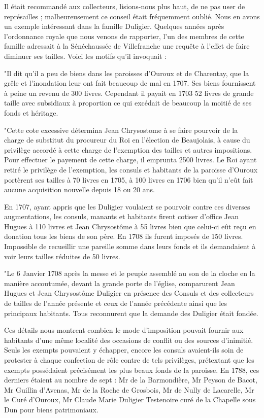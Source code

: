 Il était recommandé aux collecteurs, lisions-nous plus haut, de ne pas user de représailles ; malheureusement ce conseil était fréquemment oublié. Nous en avons un exemple intéressant dans la famille Duligier. Quelques années après l'ordonnance royale que nous venons de rapporter, l'un des membres de cette famille adressait à la Sénéchaussée de Villefranche une requête à l'effet de faire diminuer ses tailles. Voici les motifs qu'il invoquait :

"Il dit qu'il a peu de biens dans les paroisses d'Ouroux et de Charentay, que la grêle et l'inondation leur ont fait beaucoup de mal en 1707. Ses biens fournissent à peine un revenu de 300 livres. Cependant il payait en 1703 52 livres de grande taille avec subsidiaux à proportion ce qui excédait de beaucoup la moitié de ses fonds et héritage.

"Cette cote excessive détermina Jean Chrysostome à se faire pourvoir de la charge de substitut du procureur du Roi en l'élection de Beaujolais, à cause du privilège accordé à cette charge de l'exemption des tailles et autres impositions. Pour effectuer le payement de cette charge, il emprunta 2500 livres. Le Roi ayant retiré le privilège de l'exemption, les consuls et habitants de la paroisse d'Ouroux portèrent ses tailles à 70 livres en 1705, à 100 livres en 1706 bien qu'il n'eût fait aucune acquisition nouvelle depuis 18 ou 20 ans.

En 1707, ayant appris que les Duligier voulaient se pourvoir contre ces diverses augmentations, les consuls, manants et habitants firent cotiser d'office Jean Hugues à 110 livres et Jean Chrysostôme à 55 livres bien que celui-ci eût reçu en donation tous les biens de son père. En 1708 ils furent imposés de 150 livres. Impossible de recueillir une pareille somme dans leurs fonds et ils demandaient à voir leurs tailles réduites de 50 livres.

"Le 6 Janvier 1708 après la messe et le peuple assemblé au son de la cloche en la manière accoutumée, devant la grande porte de l'église, comparurent Jean Hugues et Jean Chrysostôme Duligier en présence des Consuls et des collecteurs de tailles de l'année présente
et ceux de l'année précédente ainsi que les principaux habitants. Tous reconnurent que la demande des Duligier était fondée.

Ces détails nous montrent combien le mode d'imposition pouvait fournir aux habitants d'une même localité des occasions de conflit ou des sources d'inimitié. Seuls les exempts pouvaient y échapper, encore les consuls avaient-ils soin de protester à chaque confection de rôle contre de tels privilèges, prétextant que les exempts possédaient précisément les plus beaux fonds de la paroisse. En 1788, ces derniers étaient au nombre de sept : Mr de la Barmondière, Mr Peyson de Bacot, Mr Guillin d'Avenas, Mr de la Roche de Grosbois, Mr de Nully de Lacarelle, Mr le Curé d'Ouroux, Mr Claude Marie Duligier Testenoire curé de la Chapelle sous Dun pour biens patrimoniaux.

